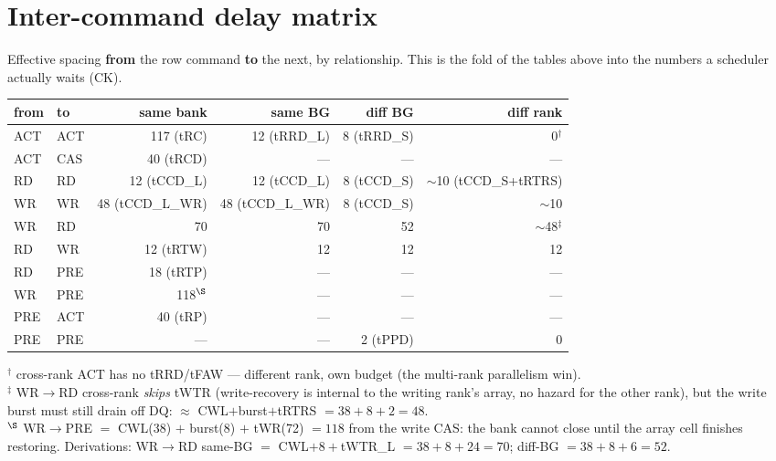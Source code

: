 \documentclass[10pt]{article}
\begin{document}
\section{Inter-command delay matrix}
Effective spacing \textbf{from} the row command \textbf{to} the next, by relationship. This is
the fold of the tables above into the numbers a scheduler actually waits (CK).

\begin{center}\small
\begin{tabular}{@{}l l r r r r@{}}
\toprule
\textbf{from} & \textbf{to} & \textbf{same bank} & \textbf{same BG} & \textbf{diff BG} & \textbf{diff rank} \\
\midrule
ACT & ACT & 117 (tRC)     & 12 (tRRD\_L) & 8 (tRRD\_S) & 0$^\dagger$ \\
ACT & CAS & 40 (tRCD)     & ---          & ---         & --- \\
RD  & RD  & 12 (tCCD\_L)  & 12 (tCCD\_L) & 8 (tCCD\_S) & $\sim$10 (tCCD\_S+tRTRS) \\
WR  & WR  & 48 (tCCD\_L\_WR) & 48 (tCCD\_L\_WR) & 8 (tCCD\_S) & $\sim$10 \\
WR  & RD  & 70            & 70           & 52          & $\sim$48$^\ddagger$ \\
RD  & WR  & 12 (tRTW)     & 12           & 12          & 12 \\
RD  & PRE & 18 (tRTP)     & ---          & ---         & --- \\
WR  & PRE & 118$^\S$      & ---          & ---         & --- \\
PRE & ACT & 40 (tRP)      & ---          & ---         & --- \\
PRE & PRE & ---           & ---          & 2 (tPPD)    & 0 \\
\bottomrule
\end{tabular}
\end{center}
{\footnotesize
$^\dagger$ cross-rank ACT has no tRRD/tFAW — different rank, own budget (the multi-rank parallelism win).\\
$^\ddagger$ WR$\rightarrow$RD cross-rank \emph{skips} tWTR (write-recovery is internal to the writing rank's array, no hazard for the other rank), but the write burst must still drain off DQ: $\approx$ CWL$+$burst$+$tRTRS $=38+8+2=48$.\\
$^\S$ WR$\rightarrow$PRE $= $ CWL(38) $+$ burst(8) $+$ tWR(72) $= 118$ from the write CAS: the bank cannot close until the array cell finishes restoring. Derivations:
WR$\rightarrow$RD same-BG $=$ CWL$+8+$tWTR\_L $=38+8+24=70$; diff-BG $=38+8+6=52$.}
\end{document}
